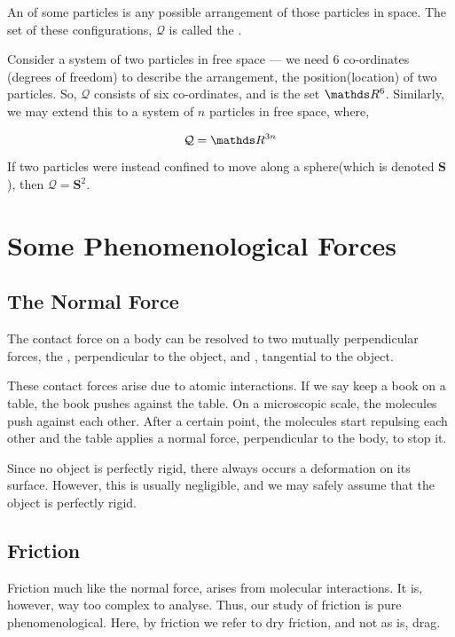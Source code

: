 An  of some particles is any possible arrangement of 
those particles in space. The set of these configurations, \(\mathcal{Q}\) is called the .

Consider a system of two particles in free space --- we need \(6\) co-ordinates (degrees of 
freedom) to describe the arrangement, the position(location) of two particles. So, 
\(\mathcal{Q}\) consists of six co-ordinates, and is the set \(\RR^6\). Similarly, we 
may extend this to a system of \(n\) particles in free space, where,

\begin{equation*}
    \mathcal{Q} = \RR^{3n}
\end{equation*}

If two particles were instead confined to move along a sphere(which is denoted \(\mathbf{S}\)),
then \(\mathcal{Q} = \mathbf{S}^2\).

\section{Some Phenomenological Forces}

\subsection{The Normal Force}

The contact force on a body can be resolved to two mutually perpendicular forces, the ,
perpendicular to the object, and , tangential to the object. 

These contact forces arise due to atomic interactions. If we say keep a book on a table,
the book pushes against the table. On a microscopic scale, the molecules push against each other.
After a certain point, the molecules start repulsing each other and the table applies a normal force,
perpendicular to the body, to stop it. 

Since no object is perfectly rigid, there always occurs a deformation on its surface. However, 
this is usually negligible, and we may safely assume that the object is perfectly rigid. 

\subsection{Friction}

Friction much like the normal force, arises from molecular interactions.
It is, however, way too complex to analyse. Thus, our study of friction is 
pure phenomenological. Here, by friction we refer to dry friction, and not as is, drag. 

